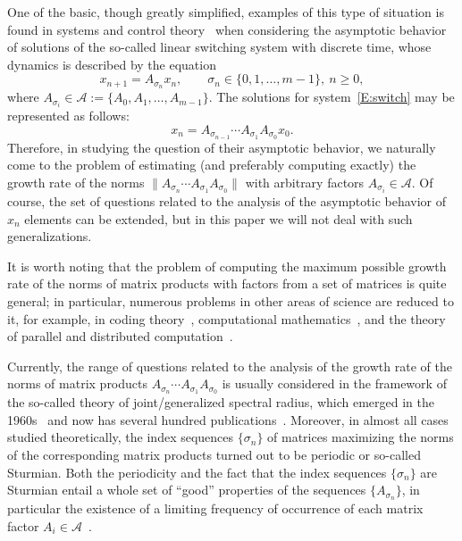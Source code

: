 \documentclass[a4paper,10pt,reqno]{amsart}
\let\cite\citep
\newcommand{\setA}{\mathscr{A}}
\begin{document}
One of the basic, though greatly simplified, examples of this type of
situation is found in systems and control theory~\cite{BrayTong:TCS79,
BT:Autom00, BC:TCS03, SWMWK:SIAMREV07, Jungers:09, WuHe:SIAMJCO20} when
considering the asymptotic behavior of solutions of the so-called linear
switching system with discrete time, whose dynamics is described by the
equation
\begin{equation}\label{E:switch} x_{n+1}=A_{\sigma_{n}}x_{n},\qquad
\sigma_{n}\in\{0,1,\ldots,m-1\},~n\ge 0,
\end{equation}
where $A_{\sigma_{i}}\in\setA:=\{A_{0},A_{1},\ldots,A_{m-1}\}$. The solutions
for system~\eqref{E:switch} may be represented as follows:
\begin{equation}\label{E:traj}
x_{n}=A_{\sigma_{n-1}}\cdots A_{\sigma_{1}}A_{\sigma_{0}}x_{0}.
\end{equation}
Therefore, in studying the question of their asymptotic behavior, we
naturally come to the problem of estimating (and preferably computing
exactly) the growth rate of the norms $\|A_{\sigma_{n}}\cdots
A_{\sigma_{1}}A_{\sigma_{0}}\|$ with arbitrary factors
$A_{\sigma_{i}}\in\setA$. Of course, the set of questions related to the
analysis of the asymptotic behavior of $x_{n}$ elements can be extended, but
in this paper we will not deal with such generalizations.

It is worth noting that the problem of computing the maximum possible growth
rate of the norms of matrix products with factors from a set of matrices is
quite general; in particular, numerous problems in other areas of science are
reduced to it, for example, in coding theory~\cite{MOS:IEEETIT01,
BJP:IEEETIT06}, computational mathematics~\cite{DaubLag:LAA92, HStr:LASP92,
Maesumi:AT98, DaubLag:LAA01, JPB:LAA08}, and the theory of parallel and
distributed computation~\cite{ChM:LAA69, BertTsi:89}.

Currently, the range of questions related to the analysis of the growth rate
of the norms of matrix products $A_{\sigma_{n}}\cdots
A_{\sigma_{1}}A_{\sigma_{0}}$ is usually considered in the framework of the
so-called theory of joint/generalized spectral radius, which emerged in the
1960s~\cite{RotaStr:IM60, DaubLag:LAA92, LagWang:LAA95, DaubLag:LAA01} and
now has several hundred publications~\cite{Koz:IITP13}. Moreover, in almost
all cases studied theoretically, the index sequences $\{\sigma_{n}\}$ of
matrices maximizing the norms of the corresponding matrix products turned out
to be periodic or so-called Sturmian. Both the periodicity and the fact that
the index sequences $\{\sigma_{n}\}$ are Sturmian entail a whole set of
``good'' properties of the sequences $\{A_{\sigma_{n}}\}$, in particular the
existence of a limiting frequency of occurrence of each matrix factor
$A_{i}\in\setA$~\cite{BM:JAMS02, BTV:SIAMJMA03, Koz:CDC05:e,
Koz:INFOPROC06:e}.
\end{document}
